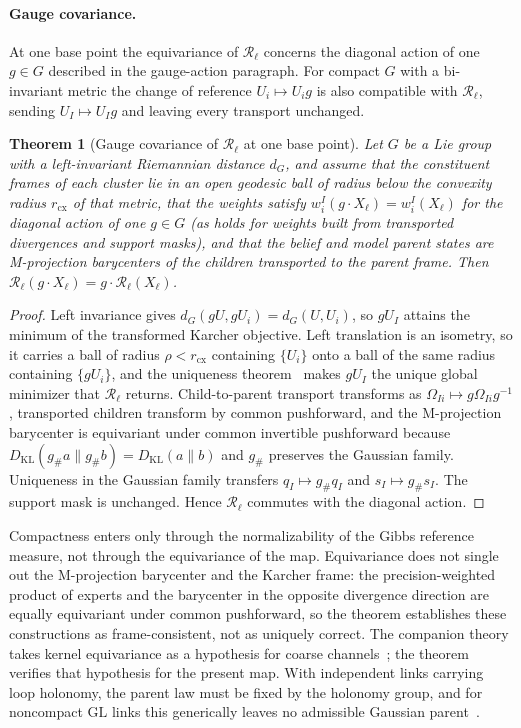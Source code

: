 \documentclass[11pt]{article}
\newtheorem{theorem}{Theorem}
\begin{document}
\paragraph{Gauge covariance.}
At one base point the equivariance of $\mathcal{R}_\ell$ concerns the diagonal action of one $g\in G$ described in the gauge-action paragraph. For compact $G$ with a bi-invariant metric the change of reference $U_i\mapsto U_ig$ is also compatible with $\mathcal{R}_\ell$, sending $U_I\mapsto U_Ig$ and leaving every transport unchanged.

\begin{theorem}[Gauge covariance of $\mathcal{R}_\ell$ at one base point]
\label{thm:rg_covariance}
Let $G$ be a Lie group with a left-invariant Riemannian distance $d_G$, and assume that the constituent frames of each cluster lie in an open geodesic ball of radius below the convexity radius $r_{\mathrm{cx}}$ of that metric, that the weights satisfy $w_i^I(g \cdot X_\ell) = w_i^I(X_\ell)$ for the diagonal action of one $g\in G$ (as holds for weights built from transported divergences and support masks), and that the belief and model parent states are M-projection barycenters of the children transported to the parent frame. Then $\mathcal{R}_\ell(g \cdot X_\ell) = g \cdot \mathcal{R}_\ell(X_\ell)$.
\end{theorem}

\begin{proof}
Left invariance gives $d_G(gU, gU_i) = d_G(U, U_i)$, so $gU_I$ attains the minimum of the transformed Karcher objective. Left translation is an isometry, so it carries a ball of radius $\rho<r_{\mathrm{cx}}$ containing $\{U_i\}$ onto a ball of the same radius containing $\{gU_i\}$, and the uniqueness theorem~\cite[Thm.~2.1]{Afsari2011} makes $gU_I$ the unique global minimizer that $\mathcal{R}_\ell$ returns. Child-to-parent transport transforms as $\Omega_{Ii} \mapsto g\Omega_{Ii}g^{-1}$, transported children transform by common pushforward, and the M-projection barycenter is equivariant under common invertible pushforward because $D_{\mathrm{KL}}(g_\# a \| g_\# b) = D_{\mathrm{KL}}(a \| b)$ and $g_\#$ preserves the Gaussian family. Uniqueness in the Gaussian family transfers $q_I \mapsto g_\# q_I$ and $s_I \mapsto g_\# s_I$. The support mask is unchanged. Hence $\mathcal{R}_\ell$ commutes with the diagonal action.
\end{proof}

Compactness enters only through the normalizability of the Gibbs reference measure, not through the equivariance of the map. Equivariance does not single out the M-projection barycenter and the Karcher frame: the precision-weighted product of experts and the barycenter in the opposite divergence direction are equally equivariant under common pushforward, so the theorem establishes these constructions as frame-consistent, not as uniquely correct. The companion theory takes kernel equivariance as a hypothesis for coarse channels~\cite[Ch.~9]{DennisGaugeVFE2026}; the theorem verifies that hypothesis for the present map. With independent links carrying loop holonomy, the parent law must be fixed by the holonomy group, and for noncompact $\mathrm{GL}$ links this generically leaves no admissible Gaussian parent~\cite[Ch.~10]{DennisGaugeVFE2026}.
\end{document}

